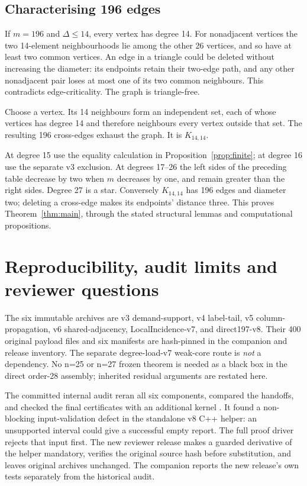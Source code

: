 \documentclass[11pt,a4paper]{article}
\begin{document}
\subsection{Characterising 196 edges}
If $m=196$ and $\Delta\le14$, every vertex has degree 14. For nonadjacent vertices the two 14-element neighbourhoods lie among the other 26 vertices, and so have at least two common vertices. An edge in a triangle could be deleted without increasing the diameter: its endpoints retain their two-edge path, and any other nonadjacent pair loses at most one of its two common neighbours. This contradicts edge-criticality. The graph is triangle-free.

Choose a vertex. Its 14 neighbours form an independent set, each of whose vertices has degree 14 and therefore neighbours every vertex outside that set. The resulting 196 cross-edges exhaust the graph. It is $K_{14,14}$.

At degree 15 use the equality calculation in Proposition~\ref{prop:finite}; at degree 16 use the separate v3 exclusion. At degrees 17--26 the left sides of the preceding table decrease by two when $m$ decreases by one, and remain greater than the right sides. Degree 27 is a star. Conversely $K_{14,14}$ has 196 edges and diameter two; deleting a cross-edge makes its endpoints' distance three. This proves Theorem~\ref{thm:main}, through the stated structural lemmas and computational propositions.

\section{Reproducibility, audit limits and reviewer questions}\label{sec:review}
The six immutable archives are v3 demand-support, v4 label-tail, v5 column-propagation, v6 shared-adjacency, LocalIncidence-v7, and direct197-v8. Their 400 original payload files and six manifests are hash-pinned in the companion and release inventory. The separate degree-load-v7 weak-core route is \emph{not} a dependency. No n=25 or n=27 frozen theorem is needed as a black box in the direct order-28 assembly; inherited residual arguments are restated here.

The committed internal audit reran all six components, compared the handoffs, and checked the final certificates with an additional kernel \cite{audit}. It found a non-blocking input-validation defect in the standalone v8 C++ helper: an unsupported interval could give a successful empty report. The full proof driver rejects that input first. The new reviewer release makes a guarded derivative of the helper mandatory, verifies the original source hash before substitution, and leaves original archives unchanged. The companion reports the new release's own tests separately from the historical audit.
\end{document}
